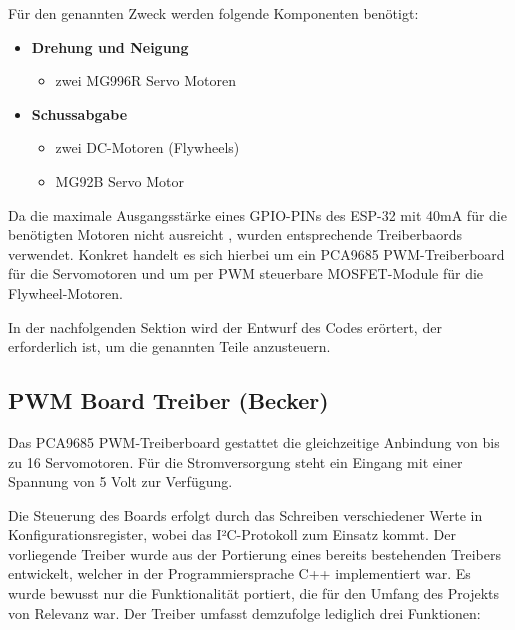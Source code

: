 Für den genannten Zweck werden folgende Komponenten benötigt:

\begin{itemize}
    \item \textbf{Drehung und Neigung}
    \begin{itemize}
        \item zwei MG996R Servo Motoren
    \end{itemize}
    \item \textbf{Schussabgabe}
    \begin{itemize}
        \item zwei DC-Motoren (Flywheels)
        \item MG92B Servo Motor
    \end{itemize}
\end{itemize}

Da die maximale Ausgangsstärke eines GPIO-PINs des ESP-32 mit 40mA \cite[S.~53]{esp_datasheet} für die benötigten Motoren nicht ausreicht \cite{esp_platform_flywheel_motor,esp_platform_small_servo,esp_platform_servo}, wurden entsprechende Treiberbaords verwendet.
Konkret handelt es sich hierbei um ein PCA9685 PWM-Treiberboard für die Servomotoren und um per PWM steuerbare MOSFET-Module für die Flywheel-Motoren.

In der nachfolgenden Sektion wird der Entwurf des Codes erörtert, der erforderlich ist, um die genannten Teile anzusteuern.

\subsection{PWM Board Treiber (Becker)}

Das PCA9685 PWM-Treiberboard gestattet die gleichzeitige Anbindung von bis zu 16 Servomotoren.
Für die Stromversorgung steht ein Eingang mit einer Spannung von 5 Volt zur Verfügung.

Die Steuerung des Boards erfolgt durch das Schreiben verschiedener Werte in Konfigurationsregister, wobei das I²C-Protokoll zum Einsatz kommt. 
Der vorliegende Treiber wurde aus der Portierung eines bereits bestehenden Treibers \cite{esp_pca9685_blueprint} entwickelt, welcher in der Programmiersprache C++ implementiert war. 
Es wurde bewusst nur die Funktionalität portiert, die für den Umfang des Projekts von Relevanz war. 
Der Treiber umfasst demzufolge lediglich drei Funktionen:

